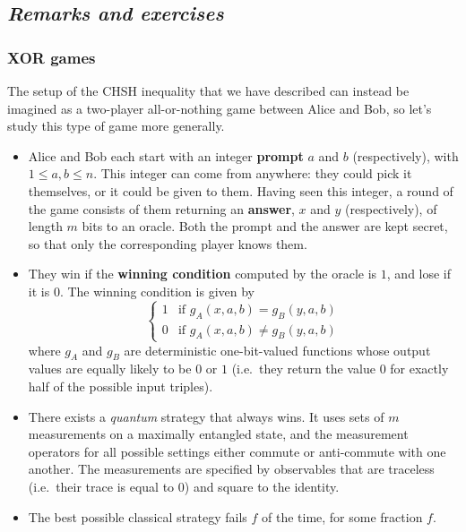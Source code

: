 \documentclass[fleqn,a4paper]{article}
\theoremstyle{definition}
\theoremstyle{definition}
\theoremstyle{definition}
\theoremstyle{definition}
\theoremstyle{remark}
\begin{document}
\hypertarget{remarks-and-exercises-bell}{%
\subsection{\texorpdfstring{\emph{Remarks and exercises}}{Remarks and exercises}}\label{remarks-and-exercises-bell}}

\hypertarget{xor-games}{%
\subsubsection{XOR games}\label{xor-games}}

The setup of the CHSH inequality that we have described can instead be imagined as a two-player all-or-nothing game between Alice and Bob, so let's study this type of game more generally.

\begin{itemize}
\item
  Alice and Bob each start with an integer \textbf{prompt} \(a\) and \(b\) (respectively), with \(1\leqslant a,b\leqslant n\).
  This integer can come from anywhere: they could pick it themselves, or it could be given to them.
  Having seen this integer, a round of the game consists of them returning an \textbf{answer}, \(x\) and \(y\) (respectively), of length \(m\) bits to an oracle.
  Both the prompt and the answer are kept secret, so that only the corresponding player knows them.
\item
  They win if the \textbf{winning condition} computed by the oracle is \(1\), and lose if it is \(0\).
  The winning condition is given by
  \[
    \begin{cases}
      1 & \text{if }g_A(x,a,b) = g_B(y,a,b)
    \\0 & \text{if }g_A(x,a,b) \neq g_B(y,a,b)
    \end{cases}
  \]
  where \(g_A\) and \(g_B\) are deterministic one-bit-valued functions whose output values are equally likely to be \(0\) or \(1\) (i.e.~they return the value \(0\) for exactly half of the possible input triples).
\item
  There exists a \emph{quantum} strategy that always wins.
  It uses sets of \(m\) measurements on a maximally entangled state, and the measurement operators for all possible settings either commute or anti-commute with one another.
  The measurements are specified by observables that are traceless (i.e.~their trace is equal to \(0\)) and square to the identity.
\item
  The best possible classical strategy fails \(f\) of the time, for some fraction \(f\).
\end{itemize}
\end{document}
